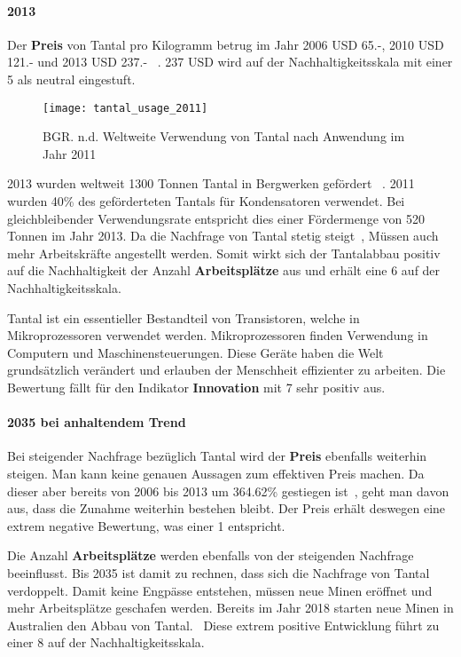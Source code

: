 \paragraph{2013}
Der \textbf{Preis} von Tantal pro Kilogramm betrug im Jahr 2006 USD 65.-, 2010 USD 121.- und 2013 USD 237.- ~\cite{tantal_price2}. 237 USD wird auf der Nachhaltigkeitsskala mit einer 5 als neutral eingestuft.

\begin{figure}[h]
\centering
\texttt{[image: tantal\_usage\_2011]}
\caption{BGR. n.d. Weltweite Verwendung von Tantal nach Anwendung im Jahr 2011 ~\cite{tantal_usage}}
\label{}
\end{figure}

2013 wurden weltweit 1300 Tonnen Tantal in Bergwerken gefördert ~\cite{tantal_price2}. 2011 wurden 40\% des geförderteten Tantals für Kondensatoren verwendet. Bei gleichbleibender Verwendungsrate entspricht dies einer Fördermenge von 520 Tonnen im Jahr 2013.
Da die Nachfrage von Tantal stetig steigt~\cite{tantal_price2}, Müssen auch mehr Arbeitskräfte angestellt werden. Somit wirkt sich der Tantalabbau positiv auf die Nachhaltigkeit der Anzahl \textbf{Arbeitsplätze} aus und erhält eine 6 auf der Nachhaltigkeitsskala.

Tantal ist ein essentieller Bestandteil von Transistoren, welche in Mikroprozessoren verwendet werden. Mikroprozessoren finden Verwendung in Computern und Maschinensteuerungen. Diese Geräte haben die Welt grundsätzlich verändert und erlauben der Menschheit effizienter zu arbeiten. Die Bewertung fällt für den Indikator \textbf{Innovation} mit 7 sehr positiv aus.

\paragraph{2035 bei anhaltendem Trend}
Bei steigender Nachfrage bezüglich Tantal wird der \textbf{Preis} ebenfalls weiterhin steigen. Man kann keine genauen Aussagen zum effektiven Preis machen. Da dieser aber bereits von 2006 bis 2013 um 364.62\% gestiegen ist~\cite{tantal_price2}, geht man davon aus, dass die Zunahme weiterhin bestehen bleibt. Der Preis erhält deswegen eine extrem negative Bewertung, was einer 1 entspricht.

Die Anzahl \textbf{Arbeitsplätze} werden ebenfalls von der steigenden Nachfrage beeinflusst. Bis 2035 ist damit zu rechnen, dass sich die Nachfrage von Tantal verdoppelt. Damit keine Engpässe entstehen, müssen neue Minen eröffnet und mehr Arbeitsplätze geschafen werden. Bereits im Jahr 2018 starten neue Minen in Australien den Abbau von Tantal.~\cite{new_mine_aus} Diese extrem positive Entwicklung führt zu einer 8 auf der Nachhaltigkeitsskala.

